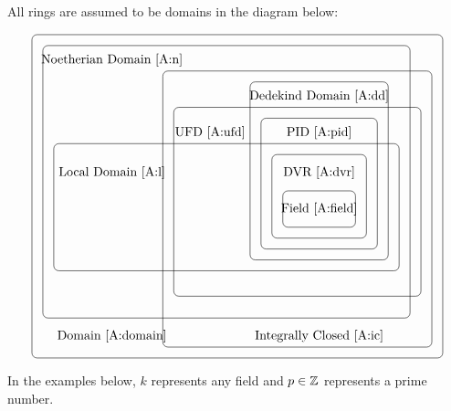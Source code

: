 \documentclass{ximera}
\begin{document}
All rings are assumed to be domains in the diagram below:

\[
\begin{tikzpicture}
\draw[rounded corners] (10,10) rectangle (12,11);
\node at (11,10.5) {Field \ref{A:field}};

\draw[rounded corners] (9.7,9.7) rectangle (12.3,12);
\node at (11,11.5) {DVR \ref{A:dvr}};

\draw[rounded corners] (9.4,9.4) rectangle (12.6,13);
\node at (11,12.6) {PID \ref{A:pid}};

\draw[rounded corners] (9.1,9.1) rectangle (12.9,14);
\node at (11,13.6) {Dedekind Domain \ref{A:dd}};

\draw[rounded corners] (7,8.1) rectangle (13.8,13.3);
\node at (8,12.6) {UFD \ref{A:ufd}};

\draw[rounded corners] (3.7
,8.8) rectangle (13.2,12.3);
\node at (5.3,11.5) {Local Domain \ref{A:l}};

\draw[rounded corners] (3.4,7.5) rectangle (13.5,15);
\node at (5.3,14.6) {Noetherian Domain \ref{A:n}};

\draw[rounded corners] (6.7,6.7) rectangle (14.1,14.3);
\node at (11,7) {Integrally Closed \ref{A:ic}};

\draw[rounded corners] (3.1,6.4) rectangle (14.4,15.3);
\node at (5.3,7) {Domain \ref{A:domain}};



\end{tikzpicture}
\]


\noindent In the examples below, $k$ represents any field and $p\in\mathbb Z$
represents a prime number.
\end{document}
